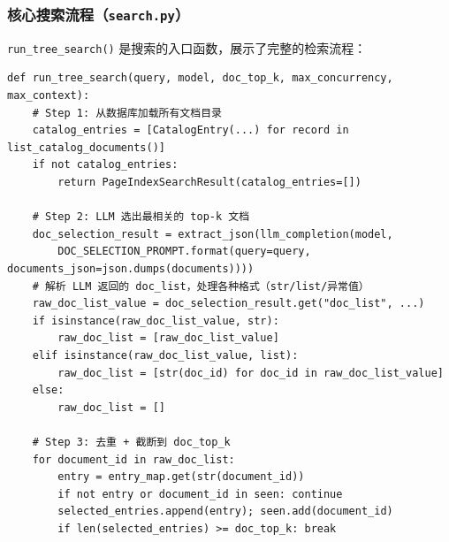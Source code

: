 \documentclass[presentation,aspectratio=169,fontset=none]{ctexbeamer}
\begin{document}
\begin{frame}[fragile]
\frametitle{核心搜索流程（\texttt{search.py}）}
{\scriptsize \texttt{run\_tree\_search()} 是搜索的入口函数，展示了完整的检索流程：}

\vspace{0.05cm}
{\tiny
\begin{verbatim}
def run_tree_search(query, model, doc_top_k, max_concurrency, max_context):
    # Step 1: 从数据库加载所有文档目录
    catalog_entries = [CatalogEntry(...) for record in list_catalog_documents()]
    if not catalog_entries:
        return PageIndexSearchResult(catalog_entries=[])

    # Step 2: LLM 选出最相关的 top-k 文档
    doc_selection_result = extract_json(llm_completion(model,
        DOC_SELECTION_PROMPT.format(query=query, documents_json=json.dumps(documents))))
    # 解析 LLM 返回的 doc_list，处理各种格式（str/list/异常值）
    raw_doc_list_value = doc_selection_result.get("doc_list", ...)
    if isinstance(raw_doc_list_value, str):
        raw_doc_list = [raw_doc_list_value]
    elif isinstance(raw_doc_list_value, list):
        raw_doc_list = [str(doc_id) for doc_id in raw_doc_list_value]
    else:
        raw_doc_list = []

    # Step 3: 去重 + 截断到 doc_top_k
    for document_id in raw_doc_list:
        entry = entry_map.get(str(document_id))
        if not entry or document_id in seen: continue
        selected_entries.append(entry); seen.add(document_id)
        if len(selected_entries) >= doc_top_k: break
\end{verbatim}}
\end{frame}

\end{document}
